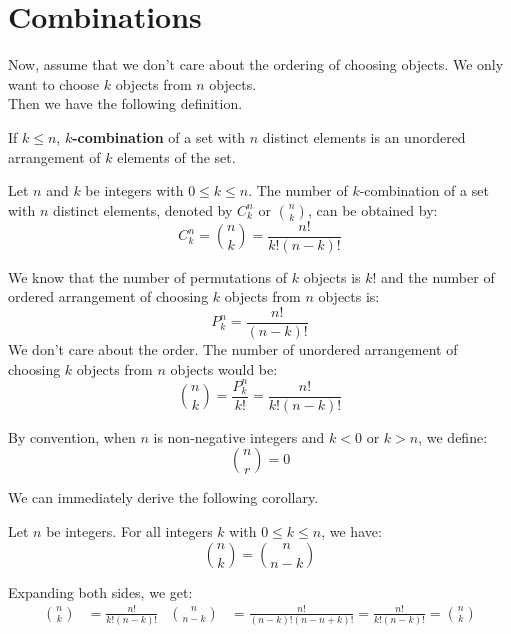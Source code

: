 \documentclass{huhtakm-template-book}
\begin{document}
\section{Combinations}
Now, assume that we don't care about the ordering of choosing objects. We only want to choose $k$ objects from $n$ objects.\\
Then we have the following definition.
\begin{defn}
	If $k\leq n$, \textbf{$k$-combination} of a set with $n$ distinct elements is an unordered arrangement of $k$ elements of the set.
\end{defn}
\begin{thm}
	Let $n$ and $k$ be integers with $0\leq k\leq n$. The number of $k$-combination of a set with $n$ distinct elements, denoted by $C_{k}^{n}$ or $\binom{n}{k}$, can be obtained by:
	\begin{equation*}
		C_{k}^{n}=\binom{n}{k}=\frac{n!}{k!(n-k)!}
	\end{equation*}
\end{thm}
\begin{proofing}
	We know that the number of permutations of $k$ objects is $k!$ and the number of ordered arrangement of choosing $k$ objects from $n$ objects is:
	\begin{equation*}
		P_{k}^{n}=\frac{n!}{(n-k)!}
	\end{equation*}
	We don't care about the order. The number of unordered arrangement of choosing $k$ objects from $n$ objects would be:
	\begin{equation*}
		\binom{n}{k}=\frac{P_{k}^{n}}{k!}=\frac{n!}{k!(n-k)!}
	\end{equation*}
\end{proofing}
\begin{rem}
	By convention, when $n$ is non-negative integers and $k<0$ or $k>n$, we define:
	\begin{equation*}
		\binom{n}{r}=0
	\end{equation*}
\end{rem}
We can immediately derive the following corollary.
\begin{cor}
	Let $n$ be integers. For all integers $k$ with $0\leq k\leq n$, we have:
	\begin{equation*}
		\binom{n}{k}=\binom{n}{n-k}
	\end{equation*}
\end{cor}
\begin{proofing}
	Expanding both sides, we get:
	\begin{align*}
		\binom{n}{k}&=\frac{n!}{k!(n-k)!} & \binom{n}{n-k}&=\frac{n!}{(n-k)!(n-n+k)!}=\frac{n!}{k!(n-k)!}=\binom{n}{k}
	\end{align*}
\end{proofing}
\end{document}
